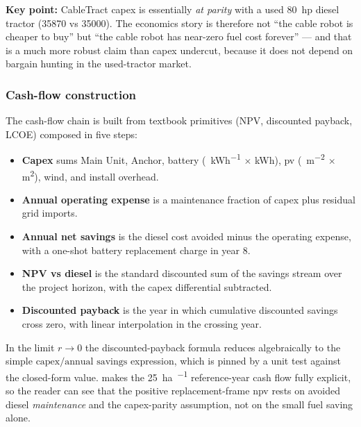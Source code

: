 \documentclass[11pt,a4paper]{article}
\begin{document}
\textbf{Key point:} CableTract \gls{capex} is essentially \emph{at parity} with a used \SI{80}{hp} diesel tractor (\SI{35870}{\EUR} vs \SI{35000}{\EUR}). The economics story is therefore not ``the cable robot is cheaper to buy'' but ``the cable robot has near-zero fuel cost forever'' --- and that is a much more robust claim than capex undercut, because it does not depend on bargain hunting in the used-tractor market.

\subsubsection{Cash-flow construction}\label{sec:cashflow}

The cash-flow chain is built from textbook primitives (NPV, discounted payback, LCOE) composed in five steps:

\begin{itemize}[leftmargin=1.6em,itemsep=0.1em]
    \item \textbf{Capex} sums Main Unit, Anchor, battery (\si{\EUR\per\kWh} $\times$ \si{\kWh}), \gls{pv} (\si{\EUR\per\meter\squared} $\times$ \si{\meter\squared}), wind, and install overhead.
    \item \textbf{Annual operating expense} is a maintenance fraction of \gls{capex} plus residual grid imports.
    \item \textbf{Annual net savings} is the diesel cost avoided minus the operating expense, with a one-shot battery replacement charge in year 8.
    \item \textbf{NPV vs diesel} is the standard discounted sum of the savings stream over the project horizon, with the capex differential subtracted.
    \item \textbf{Discounted payback} is the year in which cumulative discounted savings cross zero, with linear interpolation in the crossing year.
\end{itemize}

In the limit $r \to 0$ the discounted-payback formula reduces algebraically to the simple $\text{capex} / \text{annual savings}$ expression, which is pinned by a unit test against the closed-form value.  makes the \SI{25}{\hectare\per\year} reference-year cash flow fully explicit, so the reader can see that the positive replacement-frame \gls{npv} rests on avoided diesel \emph{maintenance} and the capex-parity assumption, not on the small fuel saving alone.
\end{document}
